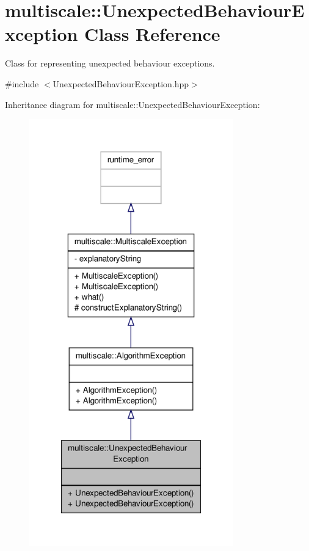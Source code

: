 \hypertarget{classmultiscale_1_1UnexpectedBehaviourException}{\section{multiscale\-:\-:Unexpected\-Behaviour\-Exception Class Reference}
\label{classmultiscale_1_1UnexpectedBehaviourException}
}


Class for representing unexpected behaviour exceptions.  




{\ttfamily \#include $<$Unexpected\-Behaviour\-Exception.\-hpp$>$}



Inheritance diagram for multiscale\-:\-:Unexpected\-Behaviour\-Exception\-:
\nopagebreak
\begin{figure}[H]
\begin{center}
\leavevmode
\includegraphics[width=250pt]{classmultiscale_1_1UnexpectedBehaviourException__inherit__graph}
\end{center}
\end{figure}


